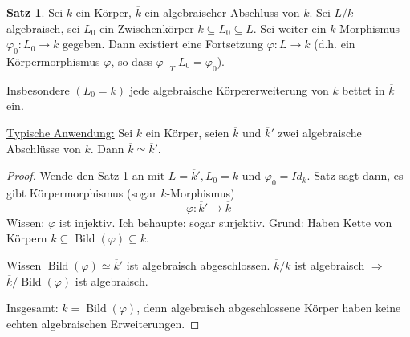 \documentclass[12pt,parskip=full]{scrartcl}
\newcommand{\heading}{\underline}
\theoremstyle{definition}
\newtheorem{theorem}{Satz}[section]
\theoremstyle{remark}
\begin{document}
	\begin{theorem}
		\label{thm:schwacherErsatzFürUniverselleEigenschaft}
		Sei $k$ ein Körper, $\overline{k}$ ein algebraischer Abschluss von $k$. Sei $L/k$ algebraisch, sei $L_0$ ein Zwischenkörper $k \subseteq L_0 \subseteq L$. Sei weiter ein $k$-Morphismus $\varphi_0: L_0 \to \overline{k}$ gegeben. Dann existiert eine Fortsetzung $\varphi: L \to \overline{k}$ (d.h. ein Körpermorphismus $\varphi$, so dass $\varphi \mid_T{L_0} = \varphi_0$).
		
		Insbesondere $(L_0 = k)$ jede algebraische Körpererweiterung von $k$ bettet in $\overline{k}$ ein.
	\end{theorem}

	\heading{Typische Anwendung:} Sei $k$ ein Körper, seien $\overline{k}$ und $\overline{k}'$ zwei algebraische Abschlüsse von $k$. Dann $\overline{k} \simeq \overline{k}'$.
	
	\begin{proof}
		Wende den Satz \ref{thm:schwacherErsatzFürUniverselleEigenschaft} an mit $L = \overline{k}', L_0 = k$ und $\varphi_0 = Id_k$. Satz sagt dann, es gibt Körpermorphismus (sogar $k$-Morphismus)
		\begin{equation*}
			\varphi: \overline{k}' \to \overline{k}
		\end{equation*}
		Wissen: $\varphi$ ist injektiv. Ich behaupte: sogar surjektiv. Grund: Haben Kette von Körpern $k \subseteq \operatorname{Bild}(\varphi) \subseteq \overline{k}$.
		
		Wissen $\operatorname{Bild}(\varphi) \simeq \overline{k}'$ ist algebraisch abgeschlossen. $\overline{k}/k$ ist algebraisch $\Rightarrow$ $\overline{k} / \operatorname{Bild}(\varphi)$ ist algebraisch.
		
		Insgesamt: $\overline{k} = \operatorname{Bild}(\varphi)$, denn algebraisch abgeschlossene Körper haben keine echten algebraischen Erweiterungen.
	\end{proof}
\end{document}
